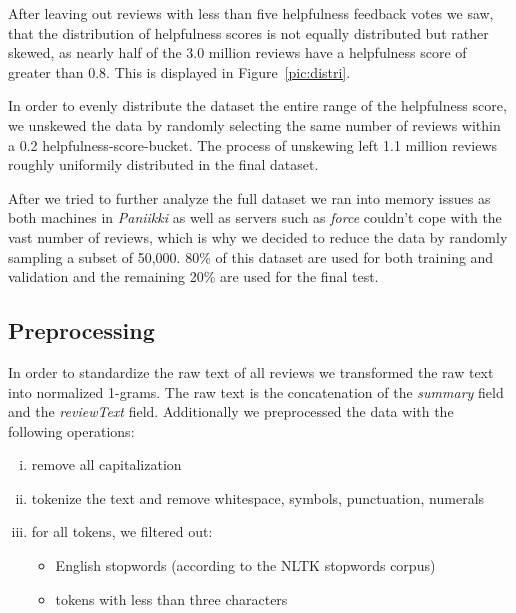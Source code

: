 \documentclass[a4paper,11pt]{article}
\begin{document}
After leaving out reviews with less than five helpfulness feedback votes we saw, that the distribution of helpfulness scores is not equally distributed but rather skewed, as nearly half of the 3.0 million reviews have a helpfulness score of greater than 0.8. This is displayed in Figure~\ref{pic:distri}. 

In order to evenly distribute the dataset the entire range of the helpfulness score, we unskewed the data by randomly selecting the same number of reviews within a 0.2 helpfulness-score-bucket. The process of unskewing left 1.1 million reviews roughly uniformily distributed in the final dataset.

After we tried to further analyze the full dataset we ran into memory issues as both machines in \textit{Paniikki} as well as servers such as \textit{force} couldn't cope with the vast number of reviews, which is why we decided to reduce the data by randomly sampling a subset of 50,000. 80\% of this dataset are used for both training and validation and the remaining 20\% are used for the final test.

\subsection{Preprocessing}

In order to standardize the raw text of all reviews we transformed the raw text into normalized 1-grams. The raw text is the concatenation of the \textit{summary} field and the \textit{reviewText} field. 
Additionally we preprocessed the data with the following operations:

\begin{enumerate}[(i)]
\item remove all capitalization
\item tokenize the text and remove whitespace, symbols, punctuation, numerals
\item for all tokens, we filtered out:
\begin{itemize}
\item English stopwords (according to the NLTK stopwords corpus)
\item tokens with less than three characters
\end{itemize}
\end{enumerate}

\end{document}
